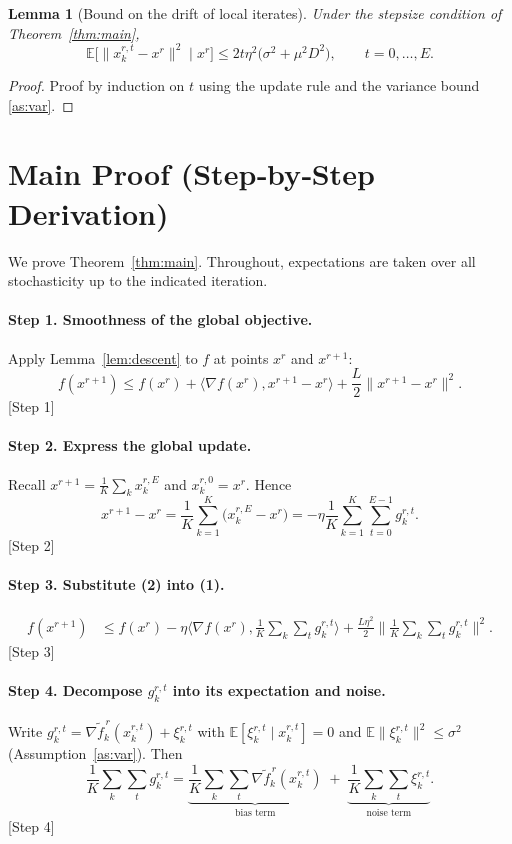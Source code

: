 \documentclass{article}
\newtheorem{lemma}{Lemma}
\newcommand{\E}{\mathbb{E}}
\begin{document}
\begin{lemma}[Bound on the drift of local iterates]\label{lem:drift}
Under the stepsize condition of Theorem~\ref{thm:main},
\[
    \E\!\bigl[\|x_{k}^{r,t}-x^{r}\|^{2}\mid x^{r}\bigr]\le
    2t\eta^{2}\bigl(\sigma^{2}+ \mu^{2}D^{2}\bigr),\qquad t=0,\dots,E.
\]
\end{lemma}
\begin{proof}
Proof by induction on $t$ using the update rule and the variance bound \ref{as:var}. \qedhere
\end{proof}

\section*{Main Proof (Step‑by‑Step Derivation)}
We prove Theorem~\ref{thm:main}. Throughout, expectations are taken over all stochasticity up to the indicated iteration.

\paragraph{Step 1. Smoothness of the global objective.}
Apply Lemma~\ref{lem:descent} to $f$ at points $x^{r}$ and $x^{r+1}$:
\[
    f(x^{r+1})\le f(x^{r})+\langle\nabla f(x^{r}),x^{r+1}-x^{r}\rangle
    +\frac{L}{2}\|x^{r+1}-x^{r}\|^{2}. \tag{1}
\]
[Step 1]

\paragraph{Step 2. Express the global update.}
Recall $x^{r+1}= \frac{1}{K}\sum_{k}x_{k}^{r,E}$ and $x_{k}^{r,0}=x^{r}$. Hence
\[
    x^{r+1}-x^{r}= \frac{1}{K}\sum_{k=1}^{K}\bigl(x_{k}^{r,E}-x^{r}\bigr)
    =-\eta\frac{1}{K}\sum_{k=1}^{K}\sum_{t=0}^{E-1}g_{k}^{r,t}. \tag{2}
\]
[Step 2]

\paragraph{Step 3. Substitute (2) into (1).}
\[
\begin{aligned}
    f(x^{r+1}) &\le f(x^{r})-\eta\Big\langle\nabla f(x^{r}),\frac{1}{K}\sum_{k}\sum_{t}g_{k}^{r,t}\Big\rangle
    +\frac{L\eta^{2}}{2}\Big\|\frac{1}{K}\sum_{k}\sum_{t}g_{k}^{r,t}\Big\|^{2}. \tag{3}
\end{aligned}
\]
[Step 3]

\paragraph{Step 4. Decompose $g_{k}^{r,t}$ into its expectation and noise.}
Write $g_{k}^{r,t}= \nabla \tilde f_{k}^{\,r}(x_{k}^{r,t})+\xi_{k}^{r,t}$ with
$\E[\xi_{k}^{r,t}\mid x_{k}^{r,t}]=0$ and $\E\|\xi_{k}^{r,t}\|^{2}\le\sigma^{2}$ (Assumption~\ref{as:var}). Then
\[
\frac{1}{K}\sum_{k}\sum_{t}g_{k}^{r,t}
=
\underbrace{\frac{1}{K}\sum_{k}\sum_{t}\nabla \tilde f_{k}^{\,r}(x_{k}^{r,t})}_{\text{bias term}}
\;+\;
\underbrace{\frac{1}{K}\sum_{k}\sum_{t}\xi_{k}^{r,t}}_{\text{noise term}}.
\tag{4}
\]
[Step 4]
\end{document}
